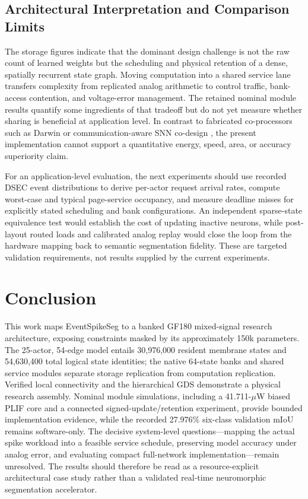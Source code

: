 \documentclass[preprint,12pt,number]{elsarticle}
\begin{document}
\subsection{Architectural Interpretation and Comparison Limits}
The storage figures indicate that the dominant design challenge is not the raw count of learned weights but the scheduling and physical retention of a dense, spatially recurrent state graph. Moving computation into a shared service lane transfers complexity from replicated analog arithmetic to control traffic, bank-access contention, and voltage-error management. The retained nominal module results quantify some ingredients of that tradeoff but do not yet measure whether sharing is beneficial at application level. In contrast to fabricated co-processors such as Darwin \cite{ma2017darwin} or communication-aware SNN co-design \cite{xiao2025codesign}, the present implementation cannot support a quantitative energy, speed, area, or accuracy superiority claim.

For an application-level evaluation, the next experiments should use recorded DSEC event distributions to derive per-actor request arrival rates, compute worst-case and typical page-service occupancy, and measure deadline misses for explicitly stated scheduling and bank configurations. An independent sparse-state equivalence test would establish the cost of updating inactive neurons, while post-layout routed loads and calibrated analog replay would close the loop from the hardware mapping back to semantic segmentation fidelity. These are targeted validation requirements, not results supplied by the current experiments.

\section{Conclusion}
This work maps EventSpikeSeg to a banked GF180 mixed-signal research architecture, exposing constraints masked by its approximately 150k parameters. The 25-actor, 54-edge model entails 30,976,000 resident membrane states and 54,630,400 total logical state identities; the native 64-state banks and shared service modules separate storage replication from computation replication. Verified local connectivity and the hierarchical GDS demonstrate a physical research assembly. Nominal module simulations, including a 41.711-$\mu$W biased PLIF core and a connected signed-update/retention experiment, provide bounded implementation evidence, while the recorded 27.976\% six-class validation mIoU remains software-only. The decisive system-level questions---mapping the actual spike workload into a feasible service schedule, preserving model accuracy under analog error, and evaluating compact full-network implementation---remain unresolved. The results should therefore be read as a resource-explicit architectural case study rather than a validated real-time neuromorphic segmentation accelerator.
\end{document}
